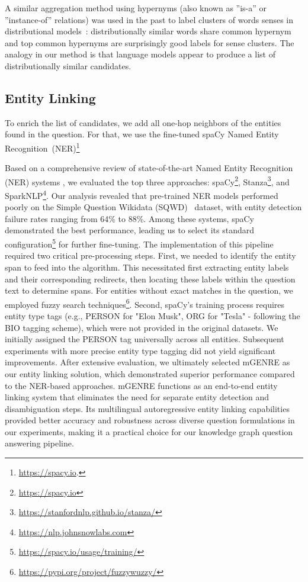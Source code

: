 A similar aggregation method using hypernyms (also known as ''is-a''  or ''instance-of'' relations) was used in the past to label clusters of words senses in distributional models~\cite{biemann2013text}: distributionally similar words share common hypernym and top common hypernyms are surprisingly good labels for sense clusters. The analogy in our method is that language models appear to produce a list of distributionally similar candidates.

\subsection{Entity Linking}
To enrich the list of candidates, we add all one-hop neighbors of the entities found in the question. For that, we use the fine-tuned spaCy Named Entity Recognition~(NER)\footnote{\url{https://spacy.io}.}

Based on a comprehensive review of state-of-the-art Named Entity Recognition (NER) systems \cite{vajjala-balasubramaniam-2022-really}, we evaluated the top three approaches: spaCy\footnote{\url{https://spacy.io}}, Stanza\footnote{\url{https://stanfordnlp.github.io/stanza/}}, and SparkNLP\footnote{\url{https://nlp.johnsnowlabs.com}}. Our analysis revealed that pre-trained NER models performed poorly on the Simple Question Wikidata (SQWD)~\cite{SQ_WD} dataset, with entity detection failure rates ranging from 64\% to 88\%. Among these systems, spaCy demonstrated the best performance, leading us to select its standard configuration\footnote{\url{https://spacy.io/usage/training/}} for further fine-tuning. The implementation of this pipeline required two critical pre-processing steps. First, we needed to identify the entity span to feed into the algorithm. This necessitated first extracting entity labels and their corresponding redirects, then locating these labels within the question text to determine spans. For entities without exact matches in the question, we employed fuzzy search techniques\footnote{\url{https://pypi.org/project/fuzzywuzzy/}}. Second, spaCy's training process requires entity type tags (e.g., PERSON for "Elon Musk", ORG for "Tesla" - following the BIO tagging scheme), which were not provided in the original datasets. We initially assigned the PERSON tag universally across all entities. Subsequent experiments with more precise entity type tagging did not yield significant improvements.
After extensive evaluation, we ultimately selected mGENRE \cite{decao2021multilingual} as our entity linking solution, which demonstrated superior performance compared to the NER-based approaches. mGENRE functions as an end-to-end entity linking system that eliminates the need for separate entity detection and disambiguation steps. Its multilingual autoregressive entity linking capabilities provided better accuracy and robustness across diverse question formulations in our experiments, making it a practical choice for our knowledge graph question answering pipeline.

